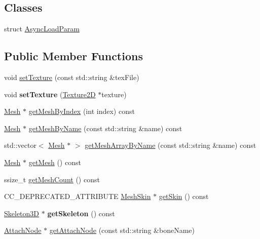 \subsection*{Classes}
\begin{DoxyCompactItemize}
\item 
struct \hyperlink{structSprite3D_1_1AsyncLoadParam}{Async\+Load\+Param}
\end{DoxyCompactItemize}
\subsection*{Public Member Functions}
\begin{DoxyCompactItemize}
\item 
void \hyperlink{classSprite3D_af6dc6865a71a7e768a089e5d2704b7dc}{set\+Texture} (const std\+::string \&tex\+File)
\item 
\mbox{\label{classSprite3D_a0722b001b9e876d506b540621bdac1f4}} 
void {\bfseries set\+Texture} (\hyperlink{classTexture2D}{Texture2D} $\ast$texture)
\item 
\hyperlink{classMesh}{Mesh} $\ast$ \hyperlink{classSprite3D_ad76b814ad82566849ccbf5e534157aa4}{get\+Mesh\+By\+Index} (int index) const
\item 
\hyperlink{classMesh}{Mesh} $\ast$ \hyperlink{classSprite3D_aa06f7456a6193199dfcea7e63ea60857}{get\+Mesh\+By\+Name} (const std\+::string \&name) const
\item 
std\+::vector$<$ \hyperlink{classMesh}{Mesh} $\ast$ $>$ \hyperlink{classSprite3D_af26e7cf641858e2d96fffae21db2d253}{get\+Mesh\+Array\+By\+Name} (const std\+::string \&name) const
\item 
\hyperlink{classMesh}{Mesh} $\ast$ \hyperlink{classSprite3D_ac2ecd09672fb2ab13df3bda9a4ed40c9}{get\+Mesh} () const
\item 
ssize\+\_\+t \hyperlink{classSprite3D_a472b051ff3eb91ceaf56eee60257ccae}{get\+Mesh\+Count} () const
\item 
C\+C\+\_\+\+D\+E\+P\+R\+E\+C\+A\+T\+E\+D\+\_\+\+A\+T\+T\+R\+I\+B\+U\+TE \hyperlink{classMeshSkin}{Mesh\+Skin} $\ast$ \hyperlink{classSprite3D_ae59d2299164cda3a6313eb4bd28b19e4}{get\+Skin} () const
\item 
\mbox{\label{classSprite3D_a4bee3bcf9f3ef37190455fc1063d4473}} 
\hyperlink{classSkeleton3D}{Skeleton3D} $\ast$ {\bfseries get\+Skeleton} () const
\item 
\hyperlink{classAttachNode}{Attach\+Node} $\ast$ \hyperlink{classSprite3D_ad1b573c194312fc2ceccae106a18a881}{get\+Attach\+Node} (const std\+::string \&bone\+Name)

\end{DoxyCompactItemize}
